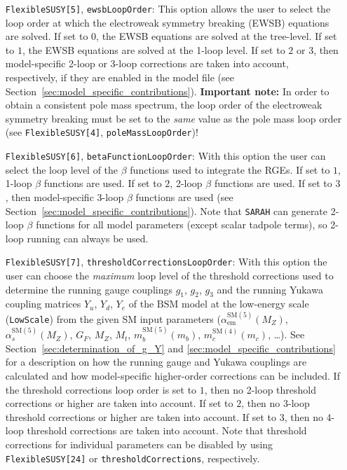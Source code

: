 \documentclass[final,3p,11pt,pdflatex]{elsarticle}
\makeatletter
\newcommand{\sarah}{\texttt{SARAH}\@\xspace}
\newcommand{\code}[1]{\lstinline|#1|}  %
\newcommand{\SM}{\ensuremath{\text{SM}}\xspace}
\newcommand{\BSM}{\ensuremath{\text{BSM}}\xspace}
\newcommand{\secref}[1]{Section~\ref{#1}}
\def\as{\alpha_s}
\def\aem{\alpha_{\text{em}}}
\makeatother
\begin{document}
\begin{itemize}
\item[\texttt{FlexibleSUSY[5]},] \texttt{ewsbLoopOrder}: This option
  allows the user to select the loop order at which the electroweak
  symmetry breaking (EWSB) equations are solved.  If set to $0$, the
  EWSB equations are solved at the tree-level.  If set to $1$, the
  EWSB equations are solved at the 1-loop level.  If set to $2$ or
  $3$, then model-specific 2-loop or 3-loop corrections are taken into
  account, respectively, if they are enabled in the model file (see
  \secref{sec:model_specific_contributions}).  \textbf{Important
    note:} In order to obtain a consistent pole mass spectrum, the
  loop order of the electroweak symmetry breaking must be set to the
  \emph{same} value as the pole mass loop order (see
  \texttt{FlexibleSUSY[4]}, \texttt{poleMassLoopOrder})!

\item[\texttt{FlexibleSUSY[6]},] \texttt{betaFunctionLoopOrder}: With
  this option the user can select the loop level of the $\beta$
  functions used to integrate the RGEs.  If set to $1$, 1-loop $\beta$
  functions are used.  If set to $2$, 2-loop $\beta$ functions are used.  If
  set to $3$, then model-specific 3-loop $\beta$ functions are used (see
  \secref{sec:model_specific_contributions}).  Note that \sarah can
  generate 2-loop $\beta$ functions for all model parameters (except
  scalar tadpole terms), so 2-loop running can always be used.

\item[\texttt{FlexibleSUSY[7]},]
  \texttt{thresholdCorrectionsLoopOrder}: With this option the user
  can choose the \emph{maximum} loop level of the threshold corrections
  used to determine the running gauge couplings $g_1$, $g_2$, $g_3$
  and the running Yukawa coupling matrices $Y_u$, $Y_d$, $Y_e$ of the
  \BSM model at the low-energy scale (\code{LowScale}) from the given
  SM input parameters ($\aem^{\SM(5)}(M_Z)$,
  $\as^{\SM(5)}(M_Z)$, $G_F$, $M_Z$, $M_t$, $m_b^{\SM(5)}(m_b)$,
  $m_c^{\SM(4)}(m_c)$, \ldots).  See \secref{sec:determination_of_g_Y}
  and \ref{sec:model_specific_contributions} for a description on how
  the running gauge and Yukawa couplings are calculated and how
  model-specific higher-order corrections can be included.  If the
  threshold corrections loop order is set to $1$, then no 2-loop
  threshold corrections or higher are taken into account.  If set to
  $2$, then no 3-loop threshold corrections or higher are taken into
  account.  If set to $3$, then no 4-loop threshold corrections are
  taken into account.
  Note that threshold corrections for individual parameters can be
  disabled by using \texttt{FlexibleSUSY[24]} or
  \texttt{thresholdCorrections}, respectively.


\end{itemize}
\end{document}
